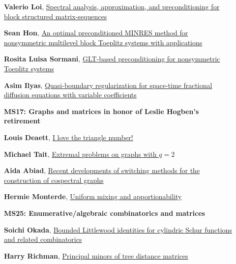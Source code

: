 \documentclass[ILAS2025-program.tex]{subfiles}
\begin{document}
\begin{description}
\begin{description}
    \item[] \hypertarget{up0173}{}\textbf{Valerio Loi}, \hyperlink{down0173}{Spectral analysis, approximation, and preconditioning for block structured matrix-sequences}
        \item[] \hypertarget{up0174}{}\textbf{Sean Hon}, \hyperlink{down0174}{An optimal preconditioned MINRES method for nonsymmetric multilevel block Toeplitz systems with applications}
        \item[] \hypertarget{up0175}{}\textbf{Rosita Luisa Sormani}, \hyperlink{down0175}{GLT-based preconditioning for nonsymmetric Toeplitz systems}
        \item[] \hypertarget{up0176}{}\textbf{Asim Ilyas}, \hyperlink{down0176}{Quasi-boundary regularization for space-time fractional diffusion equations with variable coefficients}
        \end{description}
    \begin{description}
    \item[] {\color{mstitle}\textbf{MS17: Graphs and matrices in honor of Leslie Hogben's retirement}} 
    \item[] \hypertarget{up0177}{}\textbf{Louis Deaett}, \hyperlink{down0177}{I love the triangle number!}
        \item[] \hypertarget{up0178}{}\textbf{Michael Tait}, \hyperlink{down0178}{Extremal problems on graphs with $q=2$}
        \item[] \hypertarget{up0179}{}\textbf{Aida Abiad}, \hyperlink{down0179}{Recent developments of switching methods for the construction of cospectral graphs}
        \item[] \hypertarget{up0180}{}\textbf{Hermie Monterde}, \hyperlink{down0180}{Uniform mixing and apportionability
}
        \end{description}
    \begin{description}
    \item[] {\color{mstitle}\textbf{MS25: Enumerative/algebraic combinatorics and matrices}} 
    \item[] \hypertarget{up0181}{}\textbf{Soichi Okada}, \hyperlink{down0181}{Bounded Littlewood identities for cylindric Schur functions and related combinatorics}
        \item[] \hypertarget{up0182}{}\textbf{Harry Richman}, \hyperlink{down0182}{Principal minors of tree distance matrices}

\end{description}
\end{description}
\end{document}
